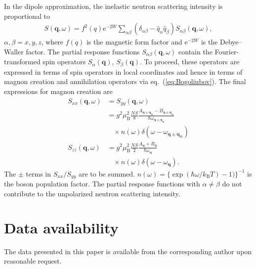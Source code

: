 \documentclass[aps,prl,amsmath,amssymb,amstext,citeautoscript,punctuation,nofootinbib,superscriptaddress,twocolumn]{revtex4-1}
\begin{document}
In the dipole approximation, the inelastic neutron scattering intensity is proportional to~\cite{Boothroyd_book}
\begin{align}
S(\textbf{q},\omega) = f^2(q)\textrm{e}^{-2W} \sum_{\alpha\beta}(\delta_{\alpha\beta}-\hat{q}_{\alpha}\hat{q}_{\beta})S_{\alpha\beta}(\textbf{q},\omega),\label{eq:S(q,w)}
\end{align}
$\alpha, \beta = x, y, z$, where $f(q)$ is the magnetic form factor and $\textrm{e}^{-2W}$ is the Debye--Waller factor. The partial response functions $S_{\alpha\beta}(\textbf{q},\omega)$ contain  the Fourier-transformed spin operators $S_\alpha(\textbf{q})$, $S_\beta(\textbf{q})$. To proceed, these operators are expressed in terms of spin operators in local coordinates and hence in terms of  magnon creation and annihilation operators via eq.~(\ref{eq:Bogoliubov}). The final expressions for magnon creation are
\begin{align}
S_{xx}(\textbf{q},\omega) & = S_{yy}(\textbf{q},\omega) \nonumber\\ & = g^2\mu_\textrm{B}^2\frac{NS}{8}\frac{A_{\textbf{q}\pm \textbf{q}_\textrm{m}} - B_{\textbf{q}\pm \textbf{q}_\textrm{m}}}{\hbar\omega_{\textbf{q}\pm \textbf{q}_\textrm{m}}}\nonumber \\ & \ \ \ \ \times n(\omega)\delta(\omega - \omega_{\textbf{q}\pm \textbf{q}_\textrm{m}})\\[10pt]
S_{zz}(\textbf{q},\omega) & = g^2\mu_\textrm{B}^2\frac{NS}{2}\frac{A_\textbf{q} + B_\textbf{q}}{\hbar\omega_\textbf{q}} \nonumber \\ & \ \ \ \ \times n(\omega)\delta(\omega - \omega_\textbf{q}).
\end{align}
The $\pm$ terms in $S_{xx}/S_{yy}$ are to be summed. $n(\omega) = \{\exp(\hbar\omega/k_\textrm{B}T) - 1)\}^{-1}$ is the boson population factor. The partial response functions with $\alpha \ne \beta$ do not contribute to the unpolarized neutron scattering intensity.

\section{Data availability}
The data presented in this paper is available from the corresponding author upon reasonable request.



\end{document}
